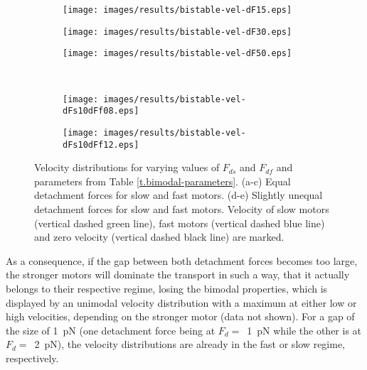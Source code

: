 \begin{figure}
\centering
\begin{subfigure}{0.3\textwidth}
 \texttt{[image: images/results/bistable-vel-dF15.eps]}
\end{subfigure}
\begin{subfigure}{0.3\textwidth}
 \texttt{[image: images/results/bistable-vel-dF30.eps]}
\end{subfigure}
\begin{subfigure}{0.3\textwidth}
 \texttt{[image: images/results/bistable-vel-dF50.eps]}
\end{subfigure}\\
\begin{subfigure}{0.3\textwidth}
 \texttt{[image: images/results/bistable-vel-dFs10dFf08.eps]}
\end{subfigure}
\begin{subfigure}{0.3\textwidth}
 \texttt{[image: images/results/bistable-vel-dFs10dFf12.eps]}
\end{subfigure}
\caption[Influence of selected detachment force $F_{d}$ combinations on bimodal velocity distribution]{Velocity distributions for varying values of $F_{ds}$ and $F_{df}$ and parameters from Table \ref{t.bimodal-parameters}. (a-c) Equal detachment forces for slow and fast motors. (d-e) Slightly unequal detachment forces for slow and fast motors. Velocity of slow motors (vertical dashed green line), fast motors (vertical dashed blue line) and zero velocity (vertical dashed black line) are marked.} 
\label{img.bimodal-dF-comparison}
\end{figure}
As a consequence, if the gap between both detachment forces becomes too large, the stronger motors will dominate the transport in such a way, that it actually belongs to their respective regime,
losing the bimodal properties, which is displayed by an unimodal velocity distribution with a maximum at either low or high velocities, depending on the stronger motor (data not shown). For a gap of the size of
\SI{1}{\pico\newton} (one detachment force being at \mbox{$F_{d} = $ \SI{1}{\pico\newton}} while the other is at \mbox{$F_{d} = $ \SI{2}{\pico\newton}}), the velocity distributions are already in
the fast or slow regime, respectively.

